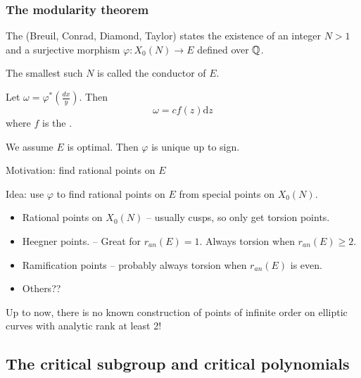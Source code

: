 \documentclass[handout]{beamer}
\begin{document}
\begin{frame}
\frametitle{The modularity theorem}


The  (Breuil, Conrad, Diamond, Taylor) states the existence of an integer $N > 1$ and a surjective morphism 
$\varphi: X_0(N) \to E$ defined over $\mathbb{Q}$.

\pause
\medskip

The smallest such $N$ is called the conductor of $E$. 

\pause
\medskip

Let $\omega = \varphi^*(\frac{dx}{y})$. Then $$\omega = c f(z) \mathrm{d} z$$ where $f$ is the .  \\

\smallskip

We assume $E$ is optimal. Then $\varphi$ is unique up to sign.


\end{frame}
\begin{frame}{Motivation: find rational points on $E$}

Idea: use $\varphi$ to find rational points on $E$ from special points on $X_0(N)$. 

\begin{itemize}
\item Rational points on $X_0(N)$ -- usually cusps, so only get torsion points.  
\item Heegner points.  -- Great for $r_{an}(E) = 1$. Always torsion when $r_{an}(E) \geq 2$.
\item Ramification points -- probably always torsion when $r_{an}(E)$ is even. 
\item Others?? 
\end{itemize}

Up to now, there is no known construction of points of infinite order on elliptic curves with 
analytic rank at least 2! 


\end{frame}



\subsection{The critical subgroup and critical polynomials}
\end{document}
